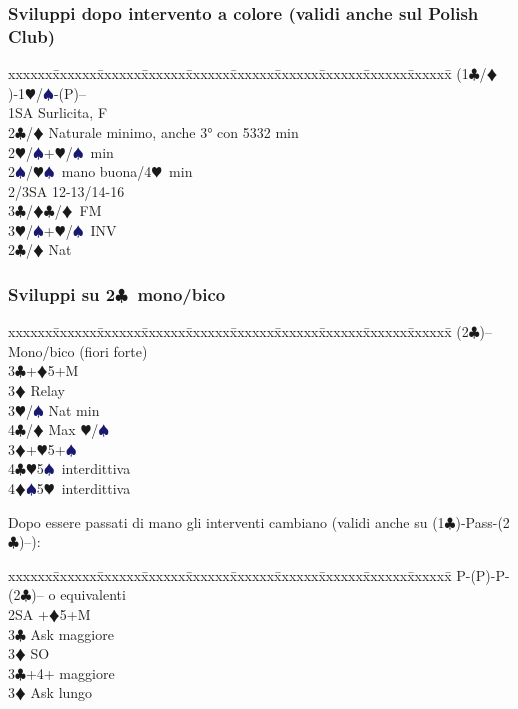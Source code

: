 \documentclass[a4paper,italian]{article}
\newcommand{\BC}{\textcolor{OliveGreen}{$\clubsuit$}}
\newcommand{\BD}{\textcolor{RedOrange}{$\vardiamondsuit$}}
\newcommand{\BH}{\textcolor{Red2}{$\varheartsuit${}}}
\newcommand{\BS}{\textcolor{MidnightBlue}{$\spadesuit${}}}
\newcommand{\pdfc}{\texorpdfstring{\BC{}}{C}}
\newenvironment{bidtable}
{\begin{tabbing}

    xxxxxx\=xxxxxx\=xxxxxx\=xxxxxx\=xxxxxx\=xxxxxx\=xxxxxx\=xxxxxx\=xxxxxx\=xxxxxx\=\kill}
{\end{tabbing} }%
\begin{document}
\begin{multicols}{2}
    \subsubsection{Sviluppi dopo intervento a colore (validi anche sul Polish Club)}

    \begin{bidtable}
        (1\BC/\BD)-1\BH/\BS-(P)--\+\\
        1SA \> Surlicita, F\+\\
        2\BC/\BD \> Naturale minimo, anche 3° con 5332 min\\
        2\BH/\BS {}+\BH/\BS\ min\\
        2\BS/\BH {}\BS\ mano buona/4\BH\ min\\
        2/3SA  12-13/14-16\\
        3\BC/\BD {}\BC/\BD\ FM\\
        3\BH/\BS {}+\BH/\BS\ INV\-\\
        2\BC/\BD \> Nat
    \end{bidtable}

    \subsubsection{Sviluppi su 2\pdfc\ mono/bico}

    \begin{bidtable}
        (2\BC)-- \> Mono/bico (fiori forte)\+\\
        3\BC {}+\BD 5+M\+\\
        3\BD \> Relay\+\\
        3\BH/\BS \> Nat min\\
        4\BC/\BD \> Max \BH /\BS \-\-\\
        3\BD {}+\BH 5+\BS \\
        4\BC {}\BH 5\BS\ interdittiva\\
        4\BD {}\BS 5\BH\ interdittiva
    \end{bidtable}
    Dopo essere passati di mano gli interventi cambiano (validi anche su (1\BC )-Pass-(2\BC )--):
    \begin{bidtable}
        P-(P)-P-(2\BC)-- o equivalenti\+\\
        2SA +\BD 5+M\+\\
        3\BC \> Ask maggiore\\
        3\BD \> SO\-\\
        3\BC {}+4+ maggiore\+\\
        3\BD \> Ask lungo
    \end{bidtable}


\end{multicols}
\end{document}
